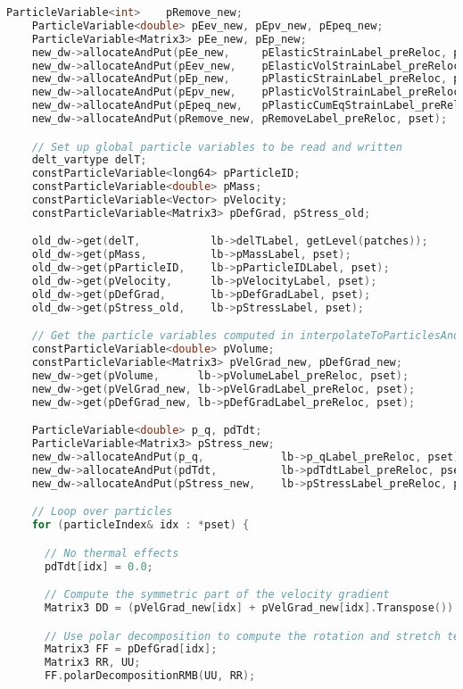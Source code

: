 \begin{enumerate}
\begin{lstlisting}[language=Cpp]
    ParticleVariable<int>    pRemove_new;
    ParticleVariable<double> pEev_new, pEpv_new, pEpeq_new;
    ParticleVariable<Matrix3> pEe_new, pEp_new;
    new_dw->allocateAndPut(pEe_new,     pElasticStrainLabel_preReloc, pset);
    new_dw->allocateAndPut(pEev_new,    pElasticVolStrainLabel_preReloc, pset);
    new_dw->allocateAndPut(pEp_new,     pPlasticStrainLabel_preReloc, pset);
    new_dw->allocateAndPut(pEpv_new,    pPlasticVolStrainLabel_preReloc, pset);
    new_dw->allocateAndPut(pEpeq_new,   pPlasticCumEqStrainLabel_preReloc, pset);
    new_dw->allocateAndPut(pRemove_new, pRemoveLabel_preReloc, pset);

    // Set up global particle variables to be read and written
    delt_vartype delT;
    constParticleVariable<long64> pParticleID;
    constParticleVariable<double> pMass;
    constParticleVariable<Vector> pVelocity;
    constParticleVariable<Matrix3> pDefGrad, pStress_old;

    old_dw->get(delT,           lb->delTLabel, getLevel(patches));
    old_dw->get(pMass,          lb->pMassLabel, pset);
    old_dw->get(pParticleID,    lb->pParticleIDLabel, pset);
    old_dw->get(pVelocity,      lb->pVelocityLabel, pset);
    old_dw->get(pDefGrad,       lb->pDefGradLabel, pset);
    old_dw->get(pStress_old,    lb->pStressLabel, pset);

    // Get the particle variables computed in interpolateToParticlesAndUpdate()
    constParticleVariable<double> pVolume;
    constParticleVariable<Matrix3> pVelGrad_new, pDefGrad_new;
    new_dw->get(pVolume,      lb->pVolumeLabel_preReloc, pset);
    new_dw->get(pVelGrad_new, lb->pVelGradLabel_preReloc, pset);
    new_dw->get(pDefGrad_new, lb->pDefGradLabel_preReloc, pset);

    ParticleVariable<double> p_q, pdTdt;
    ParticleVariable<Matrix3> pStress_new;
    new_dw->allocateAndPut(p_q,            lb->p_qLabel_preReloc, pset);
    new_dw->allocateAndPut(pdTdt,          lb->pdTdtLabel_preReloc, pset);
    new_dw->allocateAndPut(pStress_new,    lb->pStressLabel_preReloc, pset);

    // Loop over particles
    for (particleIndex& idx : *pset) {

      // No thermal effects
      pdTdt[idx] = 0.0;

      // Compute the symmetric part of the velocity gradient
      Matrix3 DD = (pVelGrad_new[idx] + pVelGrad_new[idx].Transpose()) * .5;

      // Use polar decomposition to compute the rotation and stretch tensors
      Matrix3 FF = pDefGrad[idx];
      Matrix3 RR, UU;
      FF.polarDecompositionRMB(UU, RR);


\end{lstlisting}
\end{enumerate}

